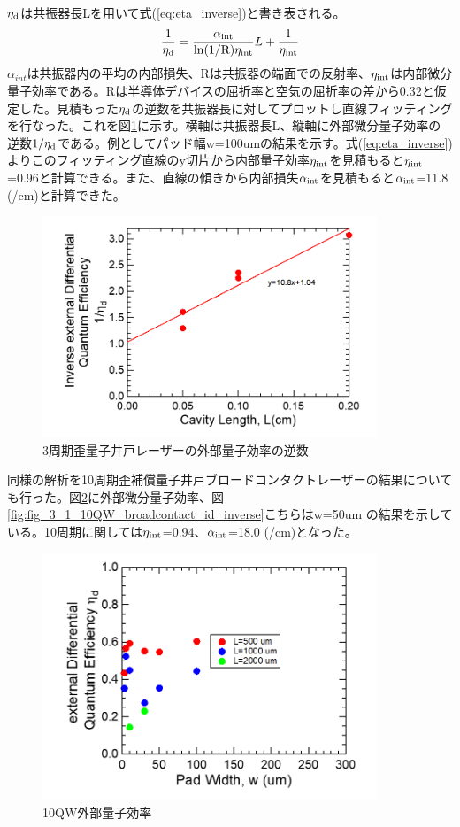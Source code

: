 {$\eta_{\rm{d}}$は共振器長Lを用いて式(\ref{eq:eta_inverse})と書き表される。
\begin{eqnarray}
\dfrac{1}{\eta_{\rm{d}}}=\dfrac{\alpha_{\rm{int}}}{\rm{ln}(1/R)\eta_{int}}L+\dfrac{1}{\eta_{\rm{int}}}
\label{eq:eta_inverse}
\end{eqnarray}
$\alpha_{int}$は共振器内の平均の内部損失、Rは共振器の端面での反射率、$\eta_{\rm{int}}$は内部微分量子効率である。Rは半導体デバイスの屈折率と空気の屈折率の差から0.32と仮定した。見積もった$\eta_{\rm{d}}$の逆数を共振器長に対してプロットし直線フィッティングを行なった。これを図\ref{fig:fig_3_1_3QW_broadcontact_id_inverse}に示す。横軸は共振器長L、縦軸に外部微分量子効率の逆数$1/\eta_{\rm{d}}$である。例としてパッド幅w=100umの結果を示す。式(\ref{eq:eta_inverse})よりこのフィッティング直線のy切片から内部量子効率$\eta_{\rm{int}}$を見積もると$\eta_{\rm{int}}$=0.96と計算できる。また、直線の傾きから内部損失$\alpha_{\rm{int}}$を見積もると$\alpha_{\rm{int}}$=11.8 (/cm)と計算できた。
\begin{figure}[h]
	\centering
	\includegraphics[width=10cm]{figure/fig_3_1_3QW_broadcontact_id_inverse.png}
	\caption{3周期歪量子井戸レーザーの外部量子効率の逆数}
	\label{fig:fig_3_1_3QW_broadcontact_id_inverse}
\end{figure}



\newpage

同様の解析を10周期歪補償量子井戸ブロードコンタクトレーザーの結果についても行った。図\ref{fig:fig_3_1_10QW_broadcontact_id}に外部微分量子効率、図\ref{fig:fig_3_1_10QW_broadcontact_id_inverse}こちらはw=50um の結果を示している。10周期に関しては$\eta_{\rm{int}}$=0.94、$\alpha_{\rm{int}}$=18.0 (/cm)となった。
\begin{figure}[h]
	\centering
	\includegraphics[width=10cm]{figure/fig_3_1_10QW_broadcontact_id.png}
	\caption{10QW外部量子効率}
	\label{fig:fig_3_1_10QW_broadcontact_id}
\end{figure}

}
